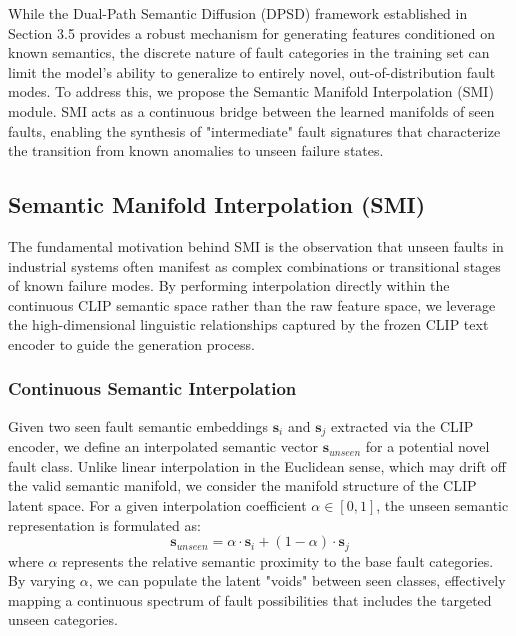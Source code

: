 While the Dual-Path Semantic Diffusion (DPSD) framework established in Section 3.5 provides a robust mechanism for generating features conditioned on known semantics, the discrete nature of fault categories in the training set can limit the model's ability to generalize to entirely novel, out-of-distribution fault modes. To address this, we propose the Semantic Manifold Interpolation (SMI) module. SMI acts as a continuous bridge between the learned manifolds of seen faults, enabling the synthesis of "intermediate" fault signatures that characterize the transition from known anomalies to unseen failure states.

\subsection{Semantic Manifold Interpolation (SMI)}

The fundamental motivation behind SMI is the observation that unseen faults in industrial systems often manifest as complex combinations or transitional stages of known failure modes. By performing interpolation directly within the continuous CLIP semantic space rather than the raw feature space, we leverage the high-dimensional linguistic relationships captured by the frozen CLIP text encoder to guide the generation process.

\subsubsection{Continuous Semantic Interpolation}
Given two seen fault semantic embeddings $\mathbf{s}_i$ and $\mathbf{s}_j$ extracted via the CLIP encoder, we define an interpolated semantic vector $\mathbf{s}_{unseen}$ for a potential novel fault class. Unlike linear interpolation in the Euclidean sense, which may drift off the valid semantic manifold, we consider the manifold structure of the CLIP latent space. For a given interpolation coefficient $\alpha \in [0, 1]$, the unseen semantic representation is formulated as:
\begin{equation}
\mathbf{s}_{unseen} = \alpha \cdot \mathbf{s}_i + (1 - \alpha) \cdot \mathbf{s}_j
\end{equation}
where $\alpha$ represents the relative semantic proximity to the base fault categories. By varying $\alpha$, we can populate the latent "voids" between seen classes, effectively mapping a continuous spectrum of fault possibilities that includes the targeted unseen categories.

